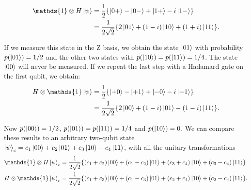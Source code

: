 \documentclass[submission, Phys]{SciPost}
\begin{document}
\begin{align}
	\mathds{1} \otimes H \ket{\psi} & = \frac{1}{2} \{ \ket{0+} - \ket{0-} + \ket{1+} - i \ket{1-} \}          \\
	                                & = \frac{1}{2 \sqrt{2}} \{ 2 \ket{01} + (1-i)\ket{10} + (1+i)\ket{11} \}.
\end{align}

If we measure this state in the Z basis, we obtain the state $\ket{01}$ with probability $p(\ket{01}) = 1/2$
and the other two states with $p(\ket{10}) = p(\ket{11}) = 1/4$.
The state $\ket{00}$ will never be measured. If we repeat the last step with a Hadamard gate on the first qubit, we obtain:
\begin{align}
	H \otimes \mathds{1} \ket{\psi} & = \frac{1}{2} \{ \ket{+0} - \ket{+1} + \ket{-0} - i \ket{-1} \}          \\
	                                & = \frac{1}{2 \sqrt{2}} \{ 2 \ket{00} + (1-i)\ket{01} - (1-i)\ket{11} \}.
\end{align}

Now $p(\ket{00}) = 1/2$, $p(\ket{01}) = p(\ket{11}) = 1/4$ and $p(\ket{10}) = 0$.
We can compare these results to an arbitrary two-qubit state $\ket{\psi}_c = c_1 \ket{00} +c_2 \ket{01} + c_3 \ket{10} +c_4 \ket{11}$,
with all the unitary transformations
\begin{align}
	\mathds{1} \otimes H \ket{\psi}_c & = \frac{1}{2\sqrt{2}} \{ (c_1+c_2) \ket{00} + (c_1 -c_2)\ket{01} + (c_3 + c_4)\ket{10} + (c_3-c_4)\ket{11} \}  \\
	H \otimes \mathds{1} \ket{\psi}_c & = \frac{1}{2\sqrt{2}} \{ (c_1+c_3) \ket{00} + (c_1 -c_3)\ket{01} + (c_2 + c_4)\ket{10} + (c_2-c_4)\ket{11} \}.
\end{align}
\end{document}

